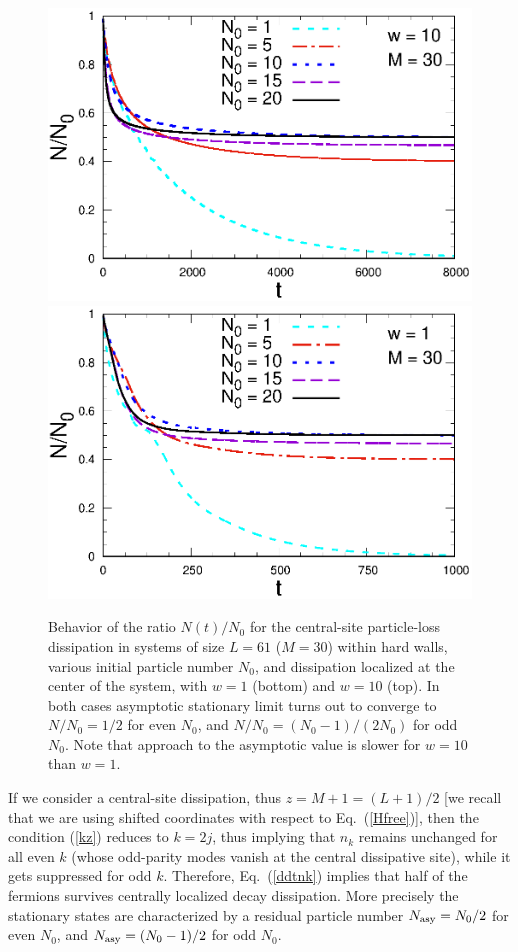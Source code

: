   
  \begin{figure}[!htb]
\centering
    \includegraphics[width=0.65\columnwidth]{imm/Now10.eps}
    \includegraphics[width=0.65\columnwidth]{imm/No.eps}
    \caption{Behavior of the ratio $N(t)/N_0$ for the central-site
      particle-loss dissipation in systems of size $L=61$ ($M=30$)
      within hard walls, various initial particle number $N_0$, and
      dissipation localized at the center of the system, with $w=1$
      (bottom) and $w=10$ (top).  In both cases asymptotic stationary
      limit turns out to converge to $N/N_0=1/2$ for even $N_0$, and
      $N/N_0=(N_0-1)/(2N_0)$ for odd $N_0$.  Note that approach to the
      asymptotic value is slower for $w=10$ than $w=1$.}
    \label{ndiffn0}
  \end{figure}
  
  
  
  If we consider a central-site dissipation, thus $z=M+1=(L+1)/2$ [we
    recall that we are using shifted coordinates with respect to
    Eq.~(\ref{Hfree})], then the condition (\ref{kz}) reduces to $k=2j$,
  thus implying that $n_k$ remains unchanged for all even $k$ (whose
  odd-parity modes vanish at the central dissipative site), while it
  gets suppressed for odd $k$. Therefore, Eq.~(\ref{ddtnk}) implies that
  half of the fermions survives centrally localized decay
  dissipation. More precisely the stationary states are characterized by
  a residual particle number $N_{\rm asy} = N_0/2$ for even $N_0$, and
  $N_{\rm asy} = (N_0-1)/2$ for odd $N_0$.
  
